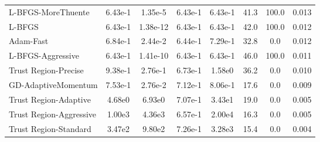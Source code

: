 \documentclass{article}
\begin{document}
\begin{table}[htbp]
{\begin{tabular}{p{2.5cm}*{7}{c}}
L-BFGS-MoreThuente & 6.43e-1 & 1.35e-5 & 6.43e-1 & 6.43e-1 & 41.3 & 100.0 & 0.013 \\
L-BFGS & 6.43e-1 & 1.38e-12 & 6.43e-1 & 6.43e-1 & 42.0 & 100.0 & 0.012 \\
Adam-Fast & 6.84e-1 & 2.44e-2 & 6.44e-1 & 7.29e-1 & 32.8 & 0.0 & 0.012 \\
L-BFGS-Aggressive & 6.43e-1 & 1.41e-10 & 6.43e-1 & 6.43e-1 & 46.0 & 100.0 & 0.011 \\
Trust Region-Precise & 9.38e-1 & 2.76e-1 & 6.73e-1 & 1.58e0 & 36.2 & 0.0 & 0.010 \\
GD-AdaptiveMomentum & 7.53e-1 & 2.76e-2 & 7.12e-1 & 8.06e-1 & 17.6 & 0.0 & 0.009 \\
Trust Region-Adaptive & 4.68e0 & 6.93e0 & 7.07e-1 & 3.43e1 & 19.0 & 0.0 & 0.005 \\
Trust Region-Aggressive & 1.00e3 & 4.36e3 & 6.57e-1 & 2.00e4 & 16.3 & 0.0 & 0.005 \\
Trust Region-Standard & 3.47e2 & 9.80e2 & 7.26e-1 & 3.28e3 & 15.4 & 0.0 & 0.004 \\
\bottomrule
\end{tabular}
}
\end{table}
\end{document}
